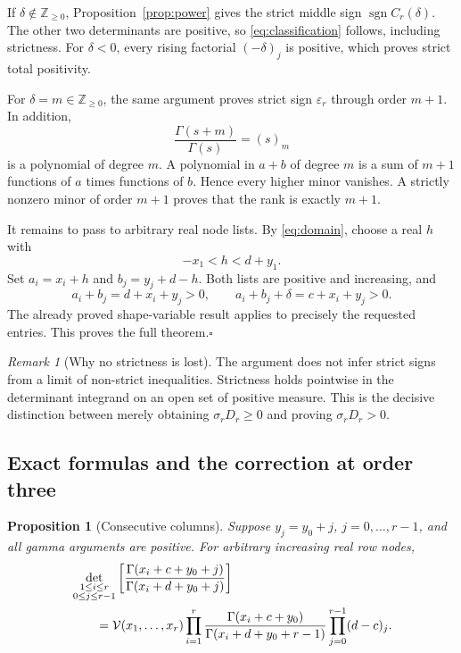 \documentclass[11pt,a4paper]{article}
\newtheorem{proposition}[theorem]{Proposition}
\theoremstyle{definition}
\theoremstyle{remark}
\newtheorem{remark}[theorem]{Remark}
\DeclareMathOperator{\sgn}{sgn}
\newcommand{\Z}{\mathbb Z}
\newcommand{\ep}{\varepsilon}
\newcommand{\V}{\mathcal V}
\begin{document}
If \(\delta\notin\Z_{\ge0}\), Proposition~\ref{prop:power} gives
the strict middle sign \(\sgn C_r(\delta)\). The other two determinants
are positive, so \eqref{eq:classification} follows, including strictness.
For \(\delta<0\), every rising factorial \((-\delta)_j\) is positive,
which proves strict total positivity.

For \(\delta=m\in\Z_{\ge0}\), the same argument proves strict sign
\(\ep_r\) through order \(m+1\). In addition,
\[
 \frac{\Gamma(s+m)}{\Gamma(s)}=(s)_m
\]
is a polynomial of degree \(m\). A polynomial in \(a+b\) of degree
\(m\) is a sum of \(m+1\) functions of \(a\) times functions of \(b\).
Hence every higher minor vanishes. A strictly nonzero minor of order
\(m+1\) proves that the rank is exactly \(m+1\).

It remains to pass to arbitrary real node lists. By
\eqref{eq:domain}, choose a real \(h\) with
\[
 -x_1<h<d+y_1.
\]
Set \(a_i=x_i+h\) and \(b_j=y_j+d-h\). Both lists are positive and
increasing, and
\[
 a_i+b_j=d+x_i+y_j>0,\qquad
 a_i+b_j+\delta=c+x_i+y_j>0.
\]
The already proved shape-variable result applies to precisely the
requested entries. This proves the full theorem.\hfill\(\square\)

\begin{remark}[Why no strictness is lost]
The argument does not infer strict signs from a limit of non-strict
inequalities. Strictness holds pointwise in the determinant integrand
on an open set of positive measure. This is the decisive distinction
between merely obtaining \(\sigma_rD_r\ge0\) and proving
\(\sigma_rD_r>0\).
\end{remark}

\subsection{Exact formulas and the correction at order three}

\begin{proposition}[Consecutive columns]\label{prop:consecutive}
Suppose \(y_j=y_0+j\), \(j=0,\ldots,r-1\), and all gamma arguments
are positive. For arbitrary increasing real row nodes,
\begin{align}\label{eq:consecutive}
 &\det_{\substack{1\le i\le r\\0\le j\le r-1}}
 \left[\frac{\Gamma(x_i+c+y_0+j)}
 {\Gamma(x_i+d+y_0+j)}\right]\notag\\
 &\qquad=
 \V(x_1,\ldots,x_r)
 \prod_{i=1}^{r}
 \frac{\Gamma(x_i+c+y_0)}{\Gamma(x_i+d+y_0+r-1)}
 \prod_{j=0}^{r-1}(d-c)_j.
\end{align}
\end{proposition}
\end{document}
